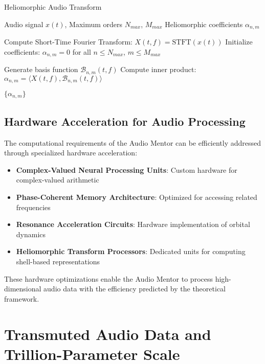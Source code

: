 \begin{algorithm}
\caption{Heliomorphic Audio Transform}
\begin{algorithmic}[1]
\Require Audio signal $x(t)$, Maximum orders $N_{max}$, $M_{max}$
\Ensure Heliomorphic coefficients $\alpha_{n,m}$

\State Compute Short-Time Fourier Transform: $X(t, f) = \text{STFT}(x(t))$
\State Initialize coefficients: $\alpha_{n,m} = 0$ for all $n \leq N_{max}$, $m \leq M_{max}$

        \State Generate basis function $\mathcal{B}_{n,m}(t, f)$
        \State Compute inner product: $\alpha_{n,m} = \langle X(t,f), \mathcal{B}_{n,m}(t,f) \rangle$
    \EndFor
\EndFor

\State \Return $\{\alpha_{n,m}\}$
\end{algorithmic}
\end{algorithm}

\subsection{Hardware Acceleration for Audio Processing}

The computational requirements of the Audio Mentor can be efficiently addressed through specialized hardware acceleration:

\begin{itemize}
    \item \textbf{Complex-Valued Neural Processing Units}: Custom hardware for complex-valued arithmetic
    \item \textbf{Phase-Coherent Memory Architecture}: Optimized for accessing related frequencies
    \item \textbf{Resonance Acceleration Circuits}: Hardware implementation of orbital dynamics
    \item \textbf{Heliomorphic Transform Processors}: Dedicated units for computing shell-based representations
\end{itemize}

These hardware optimizations enable the Audio Mentor to process high-dimensional audio data with the efficiency predicted by the theoretical framework.

\section{Transmuted Audio Data and Trillion-Parameter Scale}


